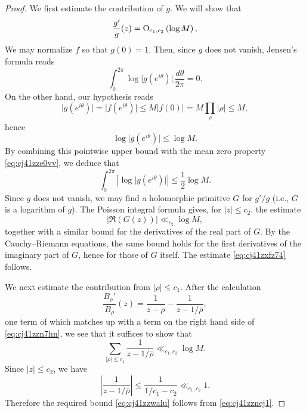 \documentclass[reqno]{amsart} 
\begin{document}
\begin{proof}
  We first estimate the contribution of $g$.  We will show that
  \begin{equation}\label{eq:cj41zxfz74}
    \frac{g'}{g}(z) = \operatorname{O}_{c_1, c_2} \left( \log M \right),
  \end{equation}
  We may normalize $f$ so that $g(0) = 1$.  Then, since $g$ does not vanish, Jensen's formula reads
  \begin{equation}\label{eq:cj41zze0vv}
    \int _{0}^{2 \pi} \log \lvert g(e^{i \theta}) \rvert \, \frac{d \theta }{2 \pi } = 0.
  \end{equation}
  On the other hand, our hypothesis reads
  \begin{equation*}
    \lvert g(e^{i \theta}) \rvert = \lvert f(e^{i \theta}) \rvert \leq M \lvert f(0) \rvert = M \prod_{\rho} |\rho| \leq M,
  \end{equation*}
  hence
  \begin{equation*}
    \log \lvert g(e^{i \theta}) \rvert \leq \log M.
  \end{equation*}
  By combining this pointwise upper bound with the mean zero property \eqref{eq:cj41zze0vv}, we deduce that
  \begin{equation*}
    \int_0^{2 \pi } \left\lvert
      \log \lvert g (e^{i \theta }) \rvert
    \right\rvert
    \leq \frac{1}{2} \log M.
  \end{equation*}
  Since $g$ does not vanish, we may find a holomorphic primitive $G$ for $g'/g$ (i.e., $G$ is a logarithm of $g$).  The Poisson integral formula gives, for $\lvert z \rvert \leq c_2$, the estimate
  \begin{equation*}
    \lvert \Re(G(z)) \rvert \ll_{c_2} \log  M,
  \end{equation*}
  together with a similar bound for the derivatives of the real part of $G$.  By the Cauchy--Riemann equations, the same bound holds for the first derivatives of the imaginary part of $G$, hence for those of $G$ itself.  The estimate \eqref{eq:cj41zxfz74} follows.

  We next estimate the contribution from $\lvert \rho \rvert \leq c_1$.  After the calculation
  \begin{equation}\label{eq:cj41z21ka5}
    \frac{B_\rho '}{B_\rho }(z) = \frac{1}{z - \rho } - \frac{1}{z - 1 / \bar{\rho }},
  \end{equation}
  one term of which matches up with a term on the right hand side of \eqref{eq:cj41zzn7hn}, we see that it suffices to show that
  \begin{equation}\label{eq:cj41zzwalu}
    \sum_{\lvert \rho \rvert \leq c_1} \frac{1}{z - 1 / \bar{\rho }} \ll_{c_1, c_2} \log M.
  \end{equation}
  Since $\lvert z \rvert \leq c_2$, we have
  \begin{equation*}
    \left\lvert \frac{1}{z - 1 / \bar{\rho }} \right\rvert \leq \frac{1}{1/c_1 - c_2} \ll_{c_1,c_2} 1.
  \end{equation*}
  Therefore the required bound \eqref{eq:cj41zzwalu} follows from \eqref{eq:cj41zznej1}.


\end{proof}
\end{document}

